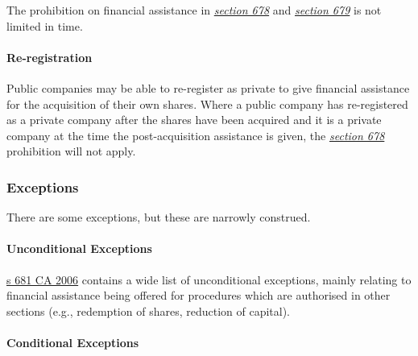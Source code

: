 \documentclass[
]{article}
\begin{document}
The prohibition on financial assistance in
\emph{\href{https://uk.westlaw.com/5-505-7258?originationContext=document\&transitionType=PLDocumentLink\&contextData=(sc.Default)\&ppcid=52c063520c5f48d8a198d13504dc80c1}{section
678}} and
\emph{\href{https://uk.westlaw.com/6-506-2056?originationContext=document\&transitionType=PLDocumentLink\&contextData=(sc.Default)\&ppcid=52c063520c5f48d8a198d13504dc80c1}{section
679}} is not limited in time.

\hypertarget{re-registration}{%
\paragraph{Re-registration}\label{re-registration}}

Public companies may be able to re-register as private to give financial
assistance for the acquisition of their own shares. Where a public
company has re-registered as a private company after the shares have
been acquired and it is a private company at the time the
post-acquisition assistance is given, the
\emph{\href{https://uk.westlaw.com/5-505-7258?originationContext=document\&transitionType=PLDocumentLink\&contextData=(sc.Default)\&ppcid=52c063520c5f48d8a198d13504dc80c1}{section
678}} prohibition will not apply.

\hypertarget{exceptions}{%
\subsubsection{Exceptions}\label{exceptions}}

There are some exceptions, but these are narrowly construed.

\hypertarget{unconditional-exceptions}{%
\paragraph{Unconditional Exceptions}\label{unconditional-exceptions}}

\href{https://www.legislation.gov.uk/ukpga/2006/46/section/681}{s 681 CA
2006} contains a wide list of unconditional exceptions, mainly relating
to financial assistance being offered for procedures which are
authorised in other sections (e.g., redemption of shares, reduction of
capital).

\hypertarget{conditional-exceptions}{%
\paragraph{Conditional Exceptions}\label{conditional-exceptions}}
\end{document}
